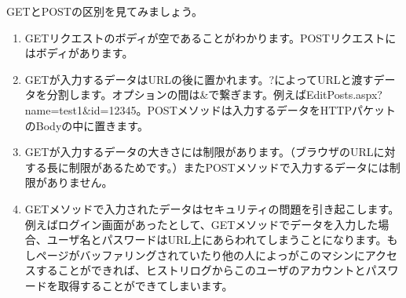 GETとPOSTの区別を見てみましょう。

\begin{enumerate}
  \item GETリクエストのボディが空であることがわかります。POSTリクエストにはボディがあります。
  \item GETが入力するデータはURLの後に置かれます。?によってURLと渡すデータを分割します。オプションの間は\&で繋ぎます。例えばEditPosts.aspx?name=test1\&id=12345。POSTメソッドは入力するデータをHTTPパケットのBodyの中に置きます。
  \item GETが入力するデータの大きさには制限があります。（ブラウザのURLに対する長に制限があるためです。）またPOSTメソッドで入力するデータには制限がありません。
  \item GETメソッドで入力されたデータはセキュリティの問題を引き起こします。例えばログイン画面があったとして、GETメソッドでデータを入力した場合、ユーザ名とパスワードはURL上にあらわれてしまうことになります。もしページがバッファリングされていたり他の人によっがこのマシンにアクセスすることができれば、ヒストリログからこのユーザのアカウントとパスワードを取得することができてしまいます。
\end{enumerate}


